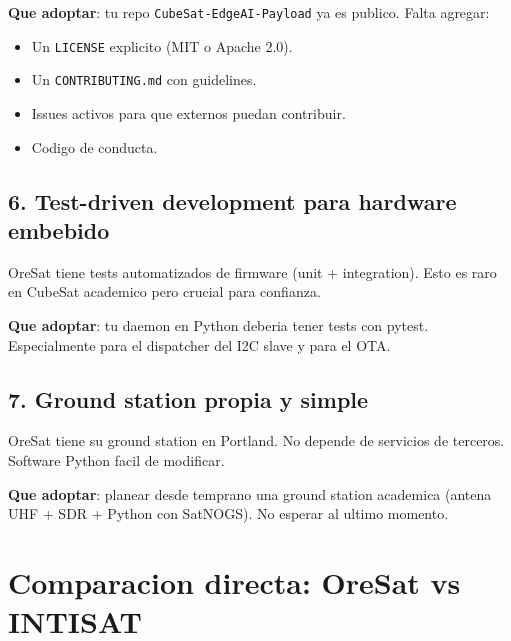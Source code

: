 \documentclass[11pt,a4paper,oneside]{report}
\begin{document}
\textbf{Que adoptar}: tu repo \texttt{CubeSat-EdgeAI-Payload} ya es publico.
Falta agregar:

\begin{itemize}[leftmargin=2em]
  \item Un \texttt{LICENSE} explicito (MIT o Apache 2.0).
  \item Un \texttt{CONTRIBUTING.md} con guidelines.
  \item Issues activos para que externos puedan contribuir.
  \item Codigo de conducta.
\end{itemize}

\section{6. Test-driven development para hardware embebido}

OreSat tiene tests automatizados de firmware (unit + integration). Esto
es raro en CubeSat academico pero crucial para confianza.

\textbf{Que adoptar}: tu daemon en Python deberia tener tests con pytest.
Especialmente para el dispatcher del I2C slave y para el OTA.

\section{7. Ground station propia y simple}

OreSat tiene su ground station en Portland. No depende de servicios de
terceros. Software Python facil de modificar.

\textbf{Que adoptar}: planear desde temprano una ground station academica
(antena UHF + SDR + Python con SatNOGS). No esperar al ultimo momento.

\chapter{Comparacion directa: OreSat vs INTISAT}
\end{document}
